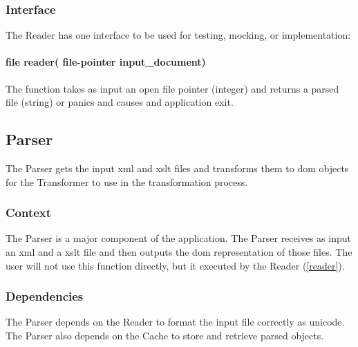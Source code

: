 \subsubsection{Interface}

The Reader has one interface to be used for testing, mocking, or implementation:

\paragraph{file reader( file-pointer input\_document)}

The function takes as input an open file pointer (integer) and returns a parsed file (string) or panics and causes and application exit.

\subsection{Parser}
\label{parser}

The Parser gets the input \gls{xml} and \gls{xslt} files and transforms them to \gls{dom} objects for the Transformer to use in the transformation process.

\subsubsection{Context}

The Parser is a major component of the application.
The Parser receives as input an \gls{xml} and a \gls{xslt} file and then outputs the \gls{dom} representation of those files.
The user will not use this function directly, but it executed by the Reader (\ref{reader}).

\subsubsection{Dependencies}

The Parser depends on the Reader to format the input file correctly as \gls{unicode}.
The Parser also depends on the Cache to store and retrieve parsed objects.

